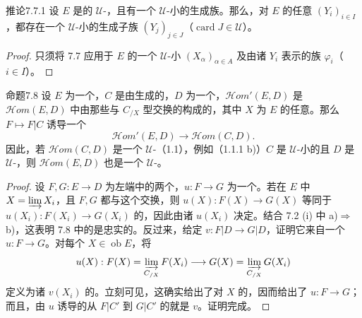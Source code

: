\begin{SGAresult}{推论}{7.7.1}
设 $E$ 是的 $\mathcal U$-，且有一个 $\mathcal U$-小的生成族。那么，对 $E$ 的任意 $(Y_i)_{i\in I}$，都存在一个 $\mathcal U$-小的生成子族 $(Y_j)_{j\in J}$（$\operatorname{card}J\in\mathcal U$）。
\end{SGAresult}
\begin{proof}
只须将 7.7 应用于 $E$ 的一个 $\mathcal U$-小 $(X_\alpha)_{\alpha\in A}$ 及由诸 $Y_i$ 表示的族 $\varphi_i$（$i\in I$）。
\end{proof}
\begin{SGAresult}{命题}{7.8}
设 $E$ 为一个，$C$ 是由生成的，$D$ 为一个，$\mathscr{H}\!om'(E,D)$ 是 $\mathscr{H}\!om(E,D)$ 中由那些与 $C_{/X}$ 型交换的构成的，其中 $X$ 为 $E$ 的任意。那么 $F\mapsto F|C$ 诱导一个
\[
\mathscr{H}\!om'(E,D)\longrightarrow\mathscr{H}\!om(C,D).
\]
因此，若 $\mathscr{H}\!om(C,D)$ 是一个 $\mathcal U$-（1.1），例如（1.1.1 b)）$C$ 是 $\mathcal U$-小的且 $D$ 是 $\mathcal U$-，则 $\mathscr{H}\!om(E,D)$ 也是一个 $\mathcal U$-。
\end{SGAresult}
\begin{proof}
设 $F,G:E\to D$ 为左端中的两个，$u:F\to G$ 为一个。若在 $E$ 中 $X=\varinjlim X_i$，且 $F,G$ 都与这个交换，则 $u(X):F(X)\to G(X)$ 等同于 $u(X_i):F(X_i)\to G(X_i)$ 的，因此由诸 $u(X_i)$ 决定。结合 7.2 (i) 中 a)$\Rightarrow$b)，这表明 7.8 中的是忠实的。反过来，给定 $v:F|D\to G|D$，证明它来自一个 $u:F\to G$。对每个 $X\in\operatorname{ob}E$，将
\[
u(X):F(X)=\varinjlim_{C_{/X}}F(X_i)\longrightarrow G(X)=\varinjlim_{C_{/X}}G(X_i)
\]
定义为诸 $v(X_i)$ 的。立刻可见，这确实给出了对 $X$ 的，因而给出了 $u:F\to G$；而且，由 $u$ 诱导的从 $F|C'$ 到 $G|C'$ 的就是 $v$。证明完成。
\end{proof}
